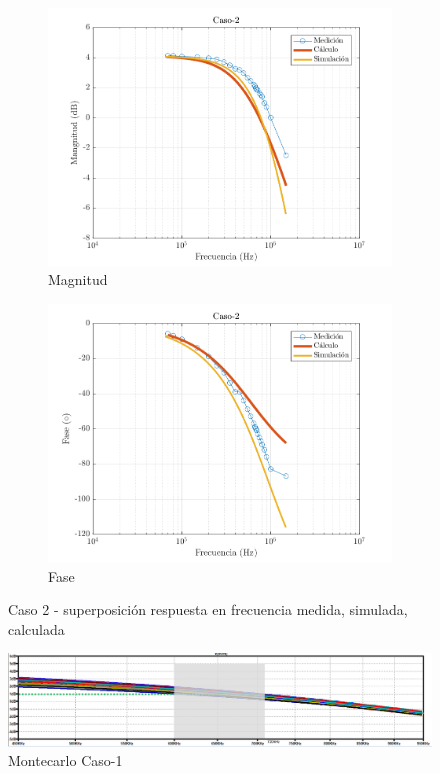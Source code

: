 \documentclass[../../main.tex]{subfiles}
\begin{document}
\begin{figure}[H]
\centering
\begin{subfigure}[http]{0.49\textwidth}
\includegraphics[width=\textwidth]{imagenes/Caso-2_mag_n.png}
\caption{Magnitud}\label{fig=magnC2}
\end{subfigure}
\begin{subfigure}[http]{0.49\textwidth}
\includegraphics[width=\textwidth]{imagenes/Caso-2_fase_n.png}
\caption{Fase}
\end{subfigure}
\caption{Caso 2 - superposición respuesta en  frecuencia medida, simulada, calculada}
\end{figure}

\begin{figure}[H]
\centering
\includegraphics[width=1\textwidth]{imagenes/montecarlo_n_c2.png}
\caption{Montecarlo Caso-1} \label{fig=mcnC2}
\end{figure}
\end{document}
